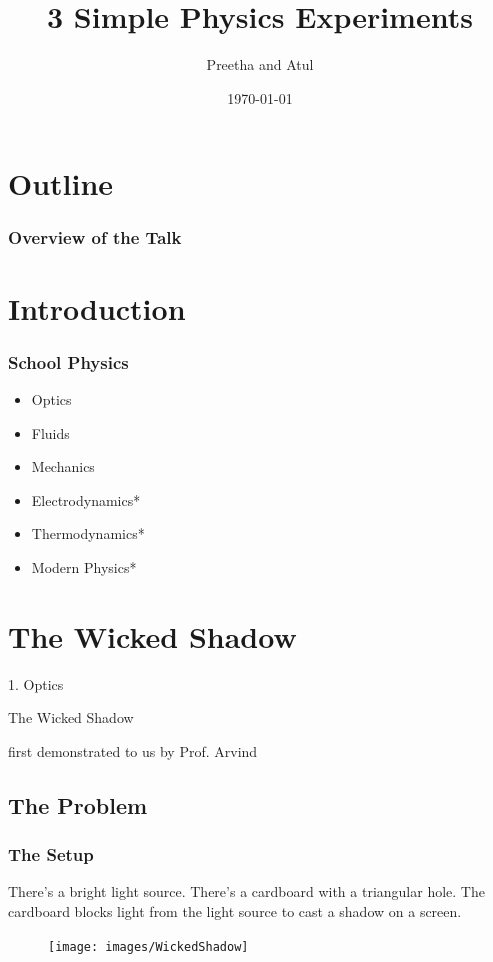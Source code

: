 \documentclass{beamer}
\title[3 Physics Experiments]{3 Simple Physics Experiments} %
\author{Preetha and Atul} %
\institute[IISER M] %
{
Indian Institute of Science Education and Research Mohali \\ %
\medskip
}
\date{\today} %
\begin{document}
\begin{frame}
\titlepage %
\end{frame}

\section{Outline}
\begin{frame}
\frametitle{Overview of the Talk} %
\tableofcontents %
\end{frame}

\section{Introduction}
\begin{frame}
	\frametitle{School Physics}
		\begin{itemize}
			\item Optics
			\item Fluids
			\item Mechanics
			\item Electrodynamics*
			\item Thermodynamics*
			\item Modern Physics*
		\end{itemize}
\end{frame}

\section{The Wicked Shadow}
	\begin{frame}
		1. Optics
		\Huge{\centerline{The Wicked Shadow}}
		\tiny{\centerline{first demonstrated to us by Prof. Arvind}}
	\end{frame}

	\subsection{The Problem}
		\begin{frame}
		\frametitle{The Setup}
			There's a bright light source. There's a cardboard with a triangular hole. The cardboard blocks light from the light source to cast a shadow on a screen.
			\begin{figure}
			\texttt{[image: images/WickedShadow]}
			\end{figure}
		\end{frame}
\end{document}
